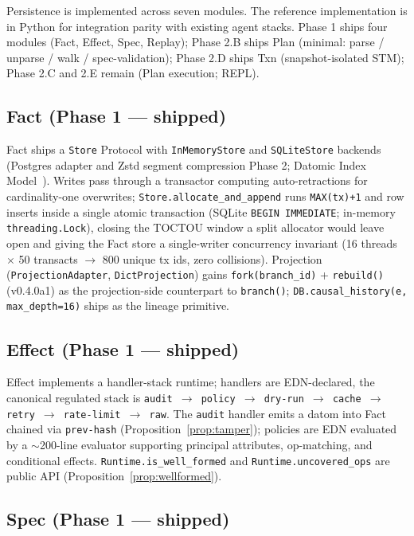\documentclass[anon]{nesy2026}   %
\newcommand{\C}[1]{\texttt{#1}}
\begin{document}
Persistence is implemented across seven modules. The reference implementation is in Python for integration parity with existing agent stacks. Phase 1 ships four modules (Fact, Effect, Spec, Replay); Phase 2.B ships Plan (minimal: parse / unparse / walk / spec-validation); Phase 2.D ships Txn (snapshot-isolated STM); Phase 2.C and 2.E remain (Plan execution; REPL).

\subsection{Fact (Phase 1 --- shipped)}\label{sec:impl-fact}

Fact ships a \C{Store} Protocol with \C{InMemoryStore} and \C{SQLiteStore} backends (Postgres adapter and Zstd segment compression Phase 2; Datomic Index Model~\citealp{tonsky2023datomic}). Writes pass through a transactor computing auto-retractions for cardinality-one overwrites; \C{Store.allocate\_and\_append} runs \C{MAX(tx)+1} and row inserts inside a single atomic transaction (SQLite \C{BEGIN IMMEDIATE}; in-memory \C{threading.Lock}), closing the TOCTOU window a split allocator would leave open and giving the Fact store a single-writer concurrency invariant (16 threads $\times$ 50 transacts $\to$ 800 unique tx ids, zero collisions). Projection (\C{ProjectionAdapter}, \C{DictProjection}) gains \C{fork(branch\_id)} + \C{rebuild()} (v0.4.0a1) as the projection-side counterpart to \C{branch()}; \C{DB.causal\_history(e, max\_depth=16)} ships as the lineage primitive.

\subsection{Effect (Phase 1 --- shipped)}\label{sec:impl-effect}

Effect implements a handler-stack runtime; handlers are EDN-declared, the canonical regulated stack is \C{audit $\to$ policy $\to$ dry-run $\to$ cache $\to$ retry $\to$ rate-limit $\to$ raw}. The \C{audit} handler emits a datom into Fact chained via \C{prev-hash} (Proposition~\ref{prop:tamper}); policies are EDN evaluated by a $\sim$200-line evaluator supporting principal attributes, op-matching, and conditional effects. \C{Runtime.is\_well\_formed} and \C{Runtime.uncovered\_ops} are public API (Proposition~\ref{prop:wellformed}).

\subsection{Spec (Phase 1 --- shipped)}\label{sec:impl-spec}
\end{document}
